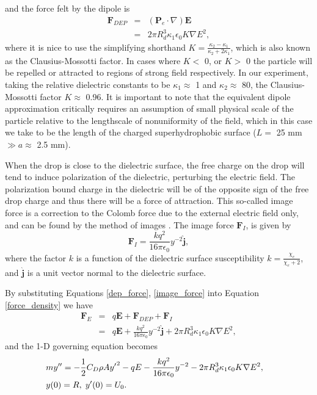 \documentclass[12pt,a4paper,oneside]{book}
\begin{document}
and the force felt by the dipole is 
\begin{eqnarray} \label{dep_force}
\mathbf{F}_{DEP} &=& \left( \mathbf{P}_e \cdot \nabla \right) \mathbf{E} \nonumber \\
&=& 2 \pi R_d^3 \kappa_1 \epsilon_0 K \nabla E^2,
\end{eqnarray}
where it is nice to use the simplifying shorthand $K = \frac{\kappa_2 - \kappa_1}{\kappa_2 + 2 \kappa_1}$, which is also known as the Clausius-Mossotti factor. In cases where $K <$ 0, or $K>$ 0 the particle will be repelled or attracted to regions of strong field respectively. In our experiment, taking the relative dielectric constants to be $\kappa_1 \approx$ 1 and $\kappa_2 \approx$ 80, the Clausius-Mossotti factor $K \approx$ 0.96. It is important to note that the equivalent dipole approximation critically requires an assumption of small physical scale of the particle relative to the lengthscale of nonuniformity of the field, which in this case we take to be the length of the charged superhydrophobic surface ($L =$ 25 mm $\gg a \approx$ 2.5 mm).

When the drop is close to the dielectric surface, the free charge on the drop will tend to induce polarization of the dielectric, perturbing the electric field. The polarization bound charge in the dielectric will be of the opposite sign of the free drop charge and thus there will be a force of attraction. This so-called image force is a correction to the Colomb force due to the external electric field only, and can be found by the method of images \cite{david_j._griffiths_introduction_1999}. The image force $\mathbf{F}_I$, is given by
\begin{equation}
\mathbf{F}_I = \frac{k q^2}{16 \pi \epsilon_0} y^{-2} \hat{\mathbf{j}},
\label{image_force}
\end{equation}
where the factor $k$ is a function of the dielectric surface susceptibility $k = \frac{\chi_e}{\chi_e + 2}$, and $\hat{\mathbf{j}}$ is a unit vector normal to the dielectric surface.

By substituting Equations \ref{dep_force}, \ref{image_force} into Equation \ref{force_density} we have
\begin{eqnarray*}
 \mathbf{F}_E &=& q \mathbf{E} + \mathbf{F}_{DEP} + \mathbf{F}_I \\
 &=& q \mathbf{E} + \frac{k q^2}{16 \pi \epsilon_0 } y^{-2} \hat{\mathbf{j}} + 2 \pi R_d^3 \kappa_1 \epsilon_0 K \nabla E^2, 
\end{eqnarray*}
and the 1-D governing equation becomes
\begin{eqnarray} \label{gov_eqn_subs}
&m y'' = - \frac{1}{2} C_D \rho A {y'}^2 - q E - \frac{k q^2}{16 \pi \epsilon_0} y^{-2}- 2 \pi R_d^3 \kappa_1 \epsilon_0 K \nabla E^2,& \nonumber \\
&y(0) = R, \hspace{1 mm} y'(0) = U_0 .&
\end{eqnarray}
\end{document}
